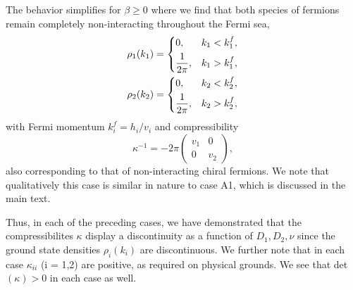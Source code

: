 \documentclass[aps,pra,
superscriptaddress,
reprint,twocolumn,preprintnumbers,
amsmath,amssymb,
nofootinbib]{revtex4-1}
\begin{document}
The behavior simplifies for $\beta\geq 0$ where we find that both species of fermions remain completely non-interacting throughout the Fermi sea,
        \begin{align}
        &\rho_1(k_1) = 
        \begin{dcases}
        0, &k_1<k_1^f ,\\
        \frac{1}{2\pi}, &k_1>k_1^f,
        \end{dcases}\nonumber\\
        &\rho_2(k_2) = 
        \begin{dcases}
        0, &k_2<k_2^f,\\
        \frac{1}{2\pi}, &k_2>k_2^f,
        \end{dcases}
        \end{align}
with Fermi momentum $k_i^f = h_i/v_i$ and compressibility
        \begin{equation}
        \kappa^{-1} = -2 \pi \left(
        \begin{array}{cc}
        v_1  & 0\\
        0 & v_2
        \end{array} \right),
        \end{equation}
also corresponding to that of non-interacting chiral fermions. We note that qualitatively this case is similar in nature to case A1, which is discussed in the main text.     
        
Thus, in each of the preceding cases, we have demonstrated that the compressibilites $\kappa$ display a discontinuity as a function of $D_1,D_2,\nu$ since the ground state densities $\rho_i(k_i)$ are discontinuous. We further note that in each case $\kappa_{ii}$ (i = 1,2) are positive, as required on physical grounds. We see that det$(\kappa)>0$ in each case as well.  
        
\end{document}
